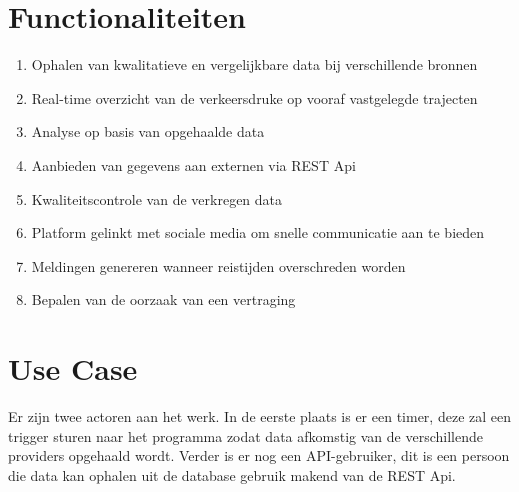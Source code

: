 \documentclass[ps,a4paper,oneside]{report}
\begin{document}
\section{Functionaliteiten}
\begin{enumerate}
\item Ophalen van kwalitatieve en vergelijkbare data bij verschillende bronnen
\item Real-time overzicht van de verkeersdruke op vooraf vastgelegde trajecten
\item Analyse op basis van opgehaalde data
\item Aanbieden van gegevens aan externen via REST Api
\item Kwaliteitscontrole van de verkregen data
\item Platform gelinkt met sociale media om snelle communicatie aan te bieden
\item Meldingen genereren wanneer reistijden overschreden worden
\item Bepalen van de oorzaak van een vertraging
\end{enumerate}
\section{Use Case}
Er zijn twee actoren aan het werk. In de eerste plaats is er een timer, deze zal een trigger sturen naar het programma zodat data afkomstig van de verschillende providers opgehaald wordt. Verder is er nog een API-gebruiker, dit is een persoon die data kan ophalen uit de database gebruik makend van de REST Api.
\end{document}
